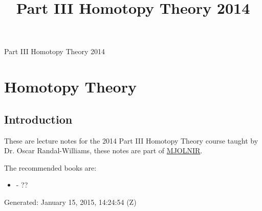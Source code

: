\documentclass[10pt,]{book}
\title{Part III Homotopy Theory 2014}
\author{}
\date{}
\theoremstyle{plain}
\theoremstyle{definition}
\begin{document}
\frontmatter
\thispagestyle{empty}
\begin{center}
{\Huge Part III Homotopy Theory 2014}
\end{center}\par
{}
\clearpage
\thispagestyle{empty}
\clearpage
\maketitle
\clearpage
\thispagestyle{empty}
\clearpage
\setcounter{tocdepth}{1}
\renewcommand*\contentsname{Contents}
\tableofcontents
\mainmatter
\typeout{************************************************}
\typeout{************************************************}
\chapter[Homotopy Theory]{Homotopy Theory}\label{chap-homotopy}
\typeout{************************************************}
\typeout{************************************************}
\section[Introduction]{Introduction}\label{sec-introduction}
These are lecture notes for the 2014 Part III Homotopy Theory course taught by Dr. Oscar Randal-Williams, these notes are part of \href{https://alexjbest.github.io/mjolnir/}{MJOLNIR}.%
\par
The recommended books are: 
          \begin{itemize}
\item{} - ??\end{itemize}

\par

          Generated: January 15, 2015, 14:24:54 (Z)
\typeout{************************************************}
\typeout{************************************************}
\end{document}
